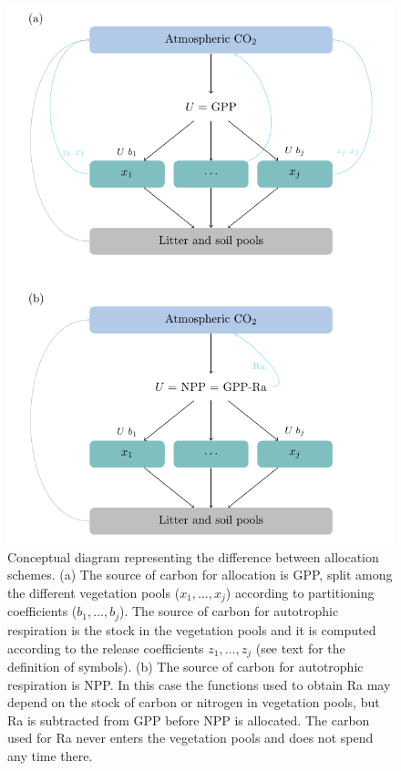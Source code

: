 \documentclass[12pt, a4paper]{article}
\begin{document}
\begin{figure}[htbp]
   \centering
   \includegraphics{diagram/conceptualDiagram.pdf} %
   \caption{Conceptual diagram representing the difference between allocation schemes. (a) The source of carbon for allocation is GPP, split among the different vegetation pools ($x_1, \dots , x_j$) according to partitioning coefficients ($b_1, \dots , b_j$). The source of carbon for autotrophic respiration is the stock in the vegetation pools and it is computed according to the release coefficients $z_1, \dots , z_j$ (see text for the definition of symbols). (b) The source of carbon for autotrophic respiration is NPP. In this case the functions used to obtain Ra may depend on the stock of carbon or nitrogen in vegetation pools, but Ra is subtracted from GPP before NPP is allocated. The carbon used for Ra never enters the vegetation pools and does not spend any time there.}
   \label{fig:concept}
\end{figure}
\end{document}
